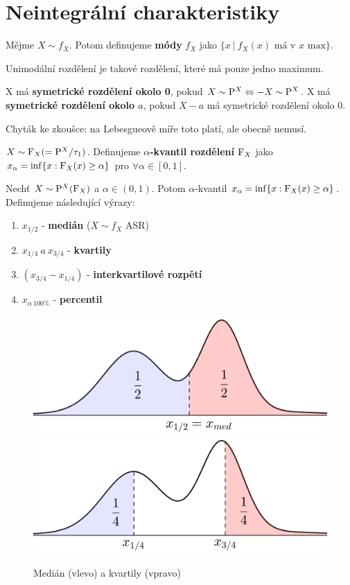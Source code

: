\section{Neintegrální charakteristiky}
\begin{define}
	Mějme $ X\sim f_X$. Potom definujeme \textbf{módy} $f_X$ jako $\{x ~|~ f_X(x)\text{ má v }x\text{ max} \}$.
\end{define}
\begin{remark}
	Unimodální rozdělení je takové rozdělení, které má pouze jedno maximum.
\end{remark}
\begin{define}
	X má \textbf{symetrické rozdělení okolo 0}, pokud $X\sim \mathrm{P}^X \Leftrightarrow -X\sim \mathrm{P}^X$. \newline
	X má \textbf{symetrické rozdělení okolo $a$}, pokud $X-a$ má symetrické rozdělení okolo 0.
\end{define}
\begin{remark}
	Chyták ke zkoušce: na Lebesgueově míře toto platí, ale obecně nemusí.
\end{remark}
\begin{define}
	$X\sim \mathrm{F}_X(=\mathrm{P}^X/\tau_1)$. Definujeme \textbf{$\alpha$-kvantil rozdělení} $\mathrm{F}_X$ jako \newline $x_\alpha=\inf\{ x:\mathrm{F}_X(x)\geq \alpha \}$ pro $\forall \alpha \in [0,1]$.
\end{define}
\begin{define}
	Nechť $X\sim \mathrm{P}^X(\mathrm{F}_X)$ a $\alpha\in(0,1)$. Potom $\alpha$-kvantil $x_\alpha = \inf\{ x:\mathrm{F}_X(x)\geq \alpha \}$. Definujeme následující výrazy:
	\begin{enumerate}
		\item $x_{1/2}$ - \textbf{medián} ($X\sim f_X$ ASR)
		\item $x_{1/4} ~a~ x_{3/4}$ - \textbf{kvartily}
		\item $(x_{3/4}-x_{1/4})$ - \textbf{interkvartilové rozpětí}
		\item $x_{\alpha~100\%}$ - \textbf{percentil}
	\end{enumerate}
\end{define}
\begin{figure}[h]
	\centering
	\includegraphics[width=0.4\linewidth]{median}
	\hspace{0.5cm}
	\includegraphics[width=0.4\linewidth]{kvartily}
	\caption{Medián (vlevo) a kvartily (vpravo)}
	\label{fig:median}
\end{figure}


